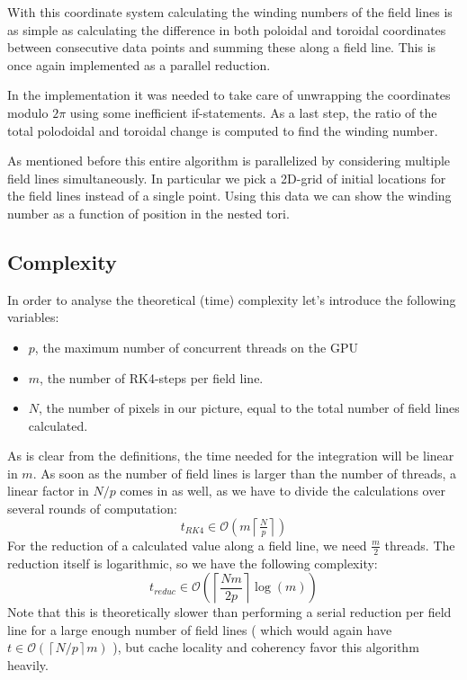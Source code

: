 \documentclass[a4paper]{article}
\renewcommand{\O}[1]{\ensuremath{\mathcal{O}\left(#1\right)}}
\begin{document}
With this coordinate system calculating the winding numbers of the field lines is as simple as calculating the difference in both poloidal and toroidal coordinates between consecutive data points and summing these along a field line. This is once again implemented as a parallel reduction.

In the implementation it was needed to take care of unwrapping the coordinates modulo $2\pi$ using some inefficient if-statements. %
As a last step, the ratio of the total polodoidal and toroidal change is computed to find the winding number.

As mentioned before this entire algorithm is parallelized by considering multiple field lines simultaneously. In particular we pick a 2D-grid of initial locations for the field lines instead of a single point. Using this data we can show the winding number as a function of position in the nested tori.\\
\subsection{Complexity}
In order to analyse the theoretical (time) complexity let's introduce the following variables:
\begin{itemize}
	\item $p$, the maximum number of concurrent threads on the GPU
	\item $m$, the number of RK4-steps per field line.
	\item $N$, the number of pixels in our picture, equal to the total number of field lines calculated.
\end{itemize}
As is clear from the definitions, the time needed for the integration will be linear in $m$. As soon as the number of field lines is larger than the number of threads, a linear factor in $N/p$ comes in as well, as we have to divide the calculations over several rounds of computation:
\[t_{RK4}\in\O{m\left\lceil\tfrac{N}{p}\right\rceil}\]
For the reduction of a calculated value along a field line, we need $\frac m2$ threads. The reduction itself is logarithmic, so we have the following complexity:
\[t_\textit{reduc} \in \O{\left\lceil\frac{Nm}{2p}\right\rceil\log\left(m\right)} \]
Note that this is theoretically slower than performing a serial reduction per field line for a large enough number of field lines ( which would again have $t \in \O{\left\lceil N/p\right\rceil m}$ ), but cache locality and coherency favor this algorithm heavily.
\end{document}
